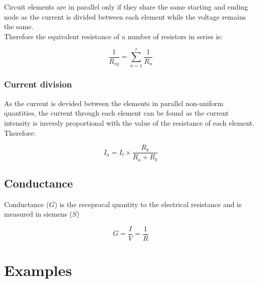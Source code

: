 \documentclass[a4paper]{book}
\begin{document}
Circuit elements are in parallel only if they share the same starting and ending node as the current is 
divided between each element while the voltage remains the same.\\
Therefore the equivalent resistance of a number of resistors in series is:

\[\frac{1}{R_{eq}} = \sum_{n=1}^r \frac{1}{R_n}\]

\subsubsection{Current division}

As the current is devided between the elements in parallel non-uniform quantities, the current through
each element can be found as the current intensity is inversly proportional with the value of the resistance of each element. Therefore:

\[I_a = I_{t} \times \frac{R_b}{R_a + R_b}\]

\subsection{Conductance}

Conductance ($G$) is the receprocal quantity to the electrical resistance and is measured in siemens ($S$)

\[G = \frac{I}{V} = \frac{1}{R}\]

\newpage
\section{Examples}

\end{document}
